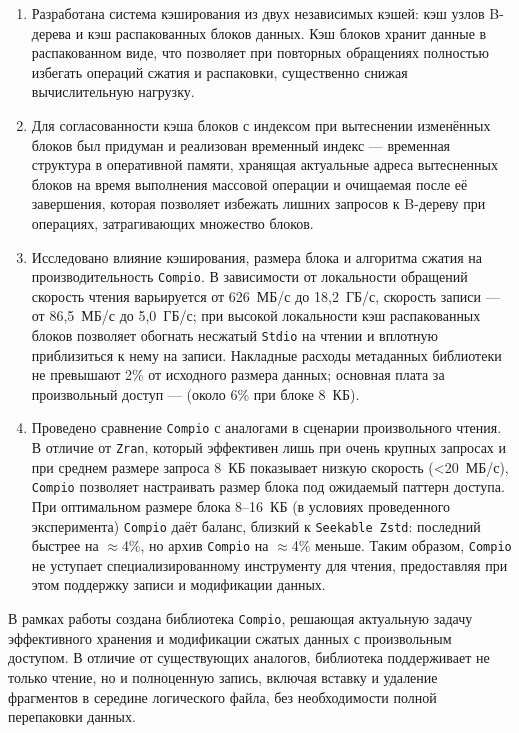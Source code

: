 \begin{enumerate}
    \item Разработана система кэширования из двух независимых кэшей: кэш узлов B-дерева и кэш распакованных блоков данных. Кэш блоков хранит данные в распакованном виде, что позволяет при повторных обращениях полностью избегать операций сжатия и распаковки, существенно снижая вычислительную нагрузку.

    \item Для согласованности кэша блоков с индексом при вытеснении изменённых блоков был придуман и реализован временный индекс --- временная структура в оперативной памяти, хранящая актуальные адреса вытесненных блоков на время выполнения массовой операции и очищаемая после её завершения, которая позволяет избежать лишних запросов к B-дереву при операциях, затрагивающих множество блоков.

    \item Исследовано влияние кэширования, размера блока и алгоритма сжатия на производительность \texttt{Compio}. В зависимости от локальности обращений скорость чтения варьируется от 626~МБ/с до 18,2~ГБ/с, скорость записи — от 86,5~МБ/с до 5,0~ГБ/с; при высокой локальности кэш распакованных блоков позволяет обогнать несжатый \texttt{Stdio} на чтении и вплотную приблизиться к нему на записи. Накладные расходы метаданных библиотеки не превышают 2\% от исходного размера данных; основная плата за произвольный доступ ---  (около 6\% при блоке 8~КБ).

    \item Проведено сравнение \texttt{Compio} с аналогами в сценарии произвольного чтения. В отличие от \texttt{Zran}, который эффективен лишь при очень крупных запросах и при среднем размере запроса 8~КБ показывает низкую скорость (<20~МБ/с), \texttt{Compio} позволяет настраивать размер блока под ожидаемый паттерн доступа. При оптимальном размере блока 8--16~КБ (в условиях проведенного эксперимента) \texttt{Compio} даёт баланс, близкий к \texttt{Seekable Zstd}: последний быстрее на $\approx$4\%, но архив \texttt{Compio} на $\approx$4\% меньше. Таким образом, \texttt{Compio} не уступает специализированному инструменту для чтения, предоставляя при этом поддержку записи и модификации данных.
\end{enumerate}

 \label{conclusion2}

В рамках работы создана библиотека \texttt{Compio}, решающая актуальную задачу эффективного хранения и модификации сжатых данных с произвольным доступом. В отличие от существующих аналогов, библиотека поддерживает не только чтение, но и полноценную запись, включая вставку и удаление фрагментов в середине логического файла, без необходимости полной перепаковки данных.

